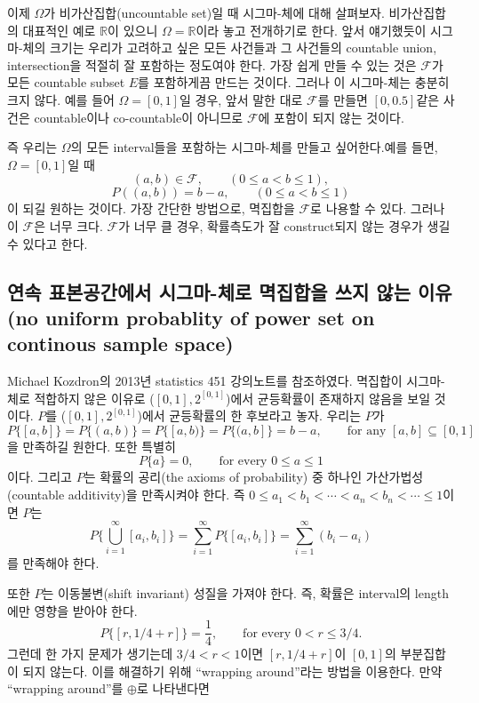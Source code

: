 \documentclass[b5paper,]{scrbook}
\theoremstyle{plain}
\theoremstyle{definition}
\numberwithin{equation}{section}
\begin{document}
이제 \(\Omega\)가 비가산집합(uncountable set)일 때 시그마-체에 대해 살펴보자. 비가산집합의 대표적인 예로 \(\mathbb{R}\)이 있으니 \(\Omega=\mathbb{R}\)이라 놓고 전개하기로 한다. 앞서 얘기했듯이 시그마-체의 크기는 우리가 고려하고 싶은 모든 사건들과 그 사건들의 countable union, intersection을 적절히 잘 포함하는 정도여야 한다. 가장 쉽게 만들 수 있는 것은 \(\mathcal{F}\)가 모든 countable subset \(E\)를 포함하게끔 만드는 것이다. 그러나 이 시그마-체는 충분히 크지 않다. 예를 들어 \(\Omega=[0,1]\)일 경우, 앞서 말한 대로 \(\mathcal{F}\)를 만들면 \([0,0.5]\)같은 사건은 countable이나 co-countable이 아니므로 \(\mathcal{F}\)에 포함이 되지 않는 것이다.

즉 우리는 \(\Omega\)의 모든 interval들을 포함하는 시그마-체를 만들고 싶어한다.예를 들면, \(\Omega=[0,1]\)일 때
\[(a,b)\in\mathcal{F}, \qquad{(0\leq a < b \leq 1),}\]
\[P((a,b))=b-a, \qquad{(0\leq a < b \leq 1)}\]
이 되길 원하는 것이다. 가장 간단한 방법으로, 멱집합을 \(\mathcal{F}\)로 나용할 수 있다. 그러나 이 \(\mathcal{F}\)은 너무 크다. \(\mathcal{F}\)가 너무 클 경우, 확률측도가 잘 construct되지 않는 경우가 생길 수 있다고 한다.

\hypertarget{-------no-uniform-probablity-of-power-set-on-continous-sample-space}{%
\subsection{연속 표본공간에서 시그마-체로 멱집합을 쓰지 않는 이유(no uniform probablity of power set on continous sample space)}\label{-------no-uniform-probablity-of-power-set-on-continous-sample-space}}

Michael Kozdron의 2013년 statistics 451 강의노트를 참조하였다. 멱집합이 시그마-체로 적합하지 않은 이유로 (\([0,1], 2^{[0,1]}\))에서 균등확률이 존재하지 않음을 보일 것이다. \(P\)를 (\([0,1], 2^{[0,1]}\))에서 균등확률의 한 후보라고 놓자. 우리는 \(P\)가
\[P\{[a,b]\}=P\{(a,b)\}=P\{[a,b)\}=P\{(a,b]\}=b-a, \qquad{\text{for any }[a,b]\subseteq [0,1]}\]
을 만족하길 원한다. 또한 특별히
\[P\{a\}=0, \qquad{\text{for every }0\leq a \leq 1}\]
이다. 그리고 \(P\)는 확률의 공리(the axioms of probability) 중 하나인 가산가법성(countable additivity)을 만족시켜야 한다. 즉 \(0\leq a_{1}<b_{1}<\cdots <a_{n}<b_{n}<\cdots \leq 1\)이면 \(P\)는
\[P\{\bigcup_{i=1}^{\infty}[a_{i},b_{i}]\}=\sum_{i=1}^{\infty}P\{[a_{i},b_{i}]\}=\sum_{i=1}^{\infty}(b_{i}-a_{i})\]
를 만족해야 한다.

또한 \(P\)는 이동불변(shift invariant) 성질을 가져야 한다. 즉, 확률은 interval의 length에만 영향을 받아야 한다.
\[P\{[r,1/4 +r]\}=\frac{1}{4}, \qquad{\text{for every } 0 < r \leq 3/4.}\]
그런데 한 가지 문제가 생기는데 \(3/4 <r < 1\)이면 \([r,1/4+r]\)이 \([0,1]\)의 부분집합이 되지 않는다. 이를 해결하기 위해 ``wrapping around''라는 방법을 이용한다. 만약 ``wrapping around''를 \(\oplus\)로 나타낸다면
\end{document}
